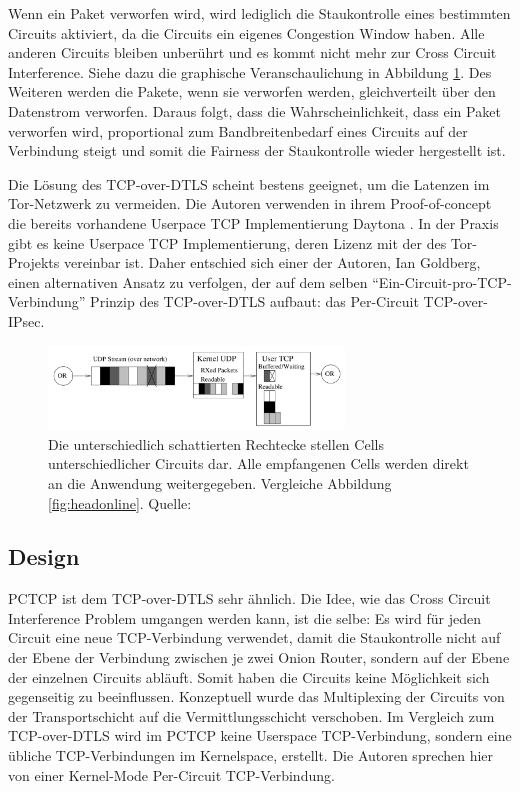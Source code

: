 \documentclass[fleqn,envcountsame,runningheads,10pt,a4paper]{llncs}
\begin{document}
Wenn ein Paket verworfen wird, wird lediglich die Staukontrolle eines bestimmten 
Circuits aktiviert, da die Circuits ein eigenes Congestion Window haben. Alle 
anderen Circuits bleiben unberührt und es kommt nicht mehr zur Cross Circuit 
Interference. Siehe dazu die graphische Veranschaulichung in Abbildung 
\ref{fig:headonlinedtls}. Des Weiteren werden die Pakete, wenn sie verworfen 
werden, gleichverteilt über den Datenstrom verworfen. Daraus folgt, dass die 
Wahrscheinlichkeit, dass ein Paket verworfen wird, proportional zum 
Bandbreitenbedarf eines Circuits auf der Verbindung steigt und somit die 
Fairness der Staukontrolle wieder hergestellt ist.

Die Lösung des TCP-over-DTLS scheint bestens geeignet, um die Latenzen im 
Tor-Netzwerk zu vermeiden. Die Autoren verwenden in ihrem Proof-of-concept die 
bereits vorhandene Userpace TCP Implementierung Daytona \cite{daytona}. In der 
Praxis gibt es keine Userpace TCP Implementierung, deren Lizenz mit der des 
Tor-Projekts vereinbar ist. Daher entschied sich einer der Autoren, Ian 
Goldberg, einen alternativen Ansatz zu verfolgen, der auf dem selben 
``Ein-Circuit-pro-TCP-Verbindung'' Prinzip des  TCP-over-DTLS aufbaut: das 
Per-Circuit TCP-over-IPsec. 

\begin{figure}[ht]
  \begin{center}
    \includegraphics[width=0.7\textwidth]{pics/headonlinedtls.pdf}
    \caption{Die unterschiedlich schattierten Rechtecke stellen Cells unterschiedlicher Circuits dar. Alle empfangenen Cells werden direkt an die Anwendung weitergegeben. Vergleiche Abbildung \ref{fig:headonline}. Quelle:\cite{tcp-over-dtls}}
    \label{fig:headonlinedtls} 
  \end{center} 
\end{figure} 

\subsection{Design}

PCTCP ist dem TCP-over-DTLS sehr ähnlich. Die Idee, wie das Cross Circuit 
Interference Problem umgangen werden kann, ist die selbe: Es wird für jeden 
Circuit eine neue TCP-Verbindung verwendet, damit die Staukontrolle nicht auf 
der Ebene der Verbindung zwischen je zwei Onion Router, sondern auf der Ebene 
der einzelnen Circuits abläuft. Somit haben die Circuits keine Möglichkeit sich 
gegenseitig zu beeinflussen. Konzeptuell wurde das Multiplexing der Circuits von 
der Transportschicht auf die Vermittlungsschicht verschoben. Im Vergleich zum 
TCP-over-DTLS wird im PCTCP keine Userspace TCP-Verbindung, sondern eine übliche 
TCP-Verbindungen im Kernelspace, erstellt. Die Autoren sprechen hier von einer 
Kernel-Mode Per-Circuit TCP-Verbindung. 
\end{document}
